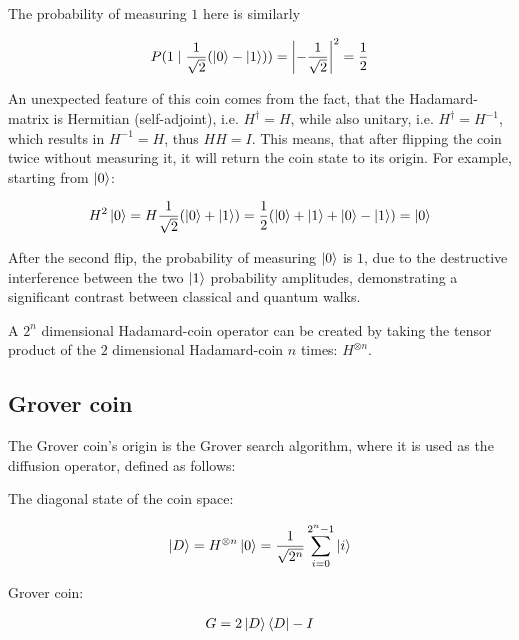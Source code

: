 The probability of measuring $1$ here is similarly

\begin{align*}
P(1 \mid \frac{1}{\sqrt{2}} (\ket{0} - \ket{1})) =
\left\lvert-\frac{1}{\sqrt{2}}\right\rvert^2 =
\frac{1}{2}
\end{align*}

An unexpected feature of this coin comes from the fact, that the Hadamard-matrix is Hermitian (self-adjoint), i.e. $H^{\dagger} = H$, while also unitary, i.e. $H^{\dagger} = H^{-1}$, which results in $H^{-1} = H$, thus $HH = I$. This means, that after flipping the coin twice without measuring it, it will return the coin state to its origin. For example, starting from $\ket{0}$:

\begin{align*}
 H^2 \ket{0} = H\frac{1}{\sqrt{2}}(\ket{0} + \ket{1}) = \frac{1}{2}(\ket{0} + \ket{1} + \ket{0} - \ket{1}) = \ket{0}
\end{align*}

After the second flip, the probability of measuring $\ket{0}$ is $1$, due to the destructive interference between the two $\ket{1}$ probability amplitudes, demonstrating a significant contrast between classical and quantum walks.

\begin{definition}

A $2^n$ dimensional Hadamard-coin operator can be created by taking the tensor product of the $2$ dimensional Hadamard-coin $n$ times: $H^{\otimes{}n}$.

\end{definition}

\subsection{Grover coin}

The Grover coin's origin is the Grover search algorithm, where it is used as the diffusion operator, defined as follows:

The diagonal state of the coin space:

\begin{align}
    \ket{D} = H^{\otimes{}n}\ket{0} = \frac{1}{\sqrt{2^n}} \sum\limits_{i=0}^{2^n-1} \ket{i}
\end{align}

Grover coin:

\begin{align}
    G = 2\ket{D}\bra{D} - I
\end{align}

